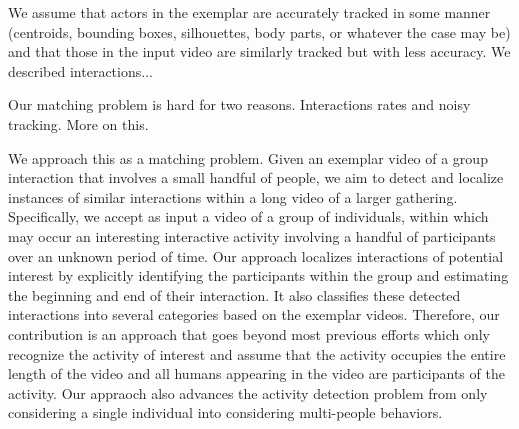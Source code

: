 We assume that actors in the exemplar are accurately tracked in some manner (centroids, bounding boxes, silhouettes, body parts, or whatever the case may be) and that those in the input video are similarly tracked but with less accuracy. We described interactions...

Our matching problem is hard for two reasons. Interactions rates and noisy tracking. More on this.



We approach this as a matching problem. Given an exemplar video of a group interaction that involves a small handful of people, we aim to detect and localize instances of similar interactions within a long video of a larger gathering. 
Specifically, we accept as input a video of a group of individuals, within which may occur an interesting interactive activity involving a handful of participants over an unknown period of time. Our approach localizes interactions of potential interest by explicitly identifying the participants within the group and estimating the beginning and end of their interaction. It also classifies these detected interactions into several categories based on the exemplar videos. Therefore, our  contribution is an approach that goes beyond most previous efforts \cite{Hongeng:act,Gong:act,Hakeem:act,McCowan:meeting,Ni:group,Choi:recogtrack,Intille:act,Vlad:group} which only recognize the activity of interest and assume that the activity occupies the entire length of the video and all humans appearing in the video are participants of the activity. Our appraoch also advances the activity detection problem from only considering a single individual \cite{Ke:detection,Yuan:detection,Shechtman:detection,Hu:detection,Laptev:detection,Duchenne:detection} into considering multi-people behaviors.

